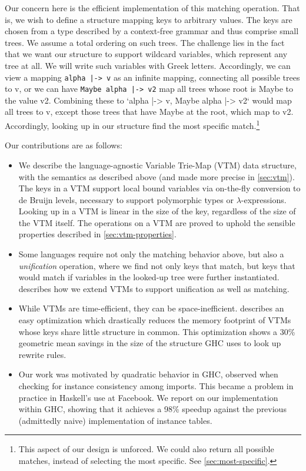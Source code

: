 \documentclass[acmsmall]{acmart}
\theoremstyle{theorem}
\theoremstyle{definition}
\theoremstyle{remark}
\begin{document}
Our concern here is the efficient implementation of this matching
operation. That is, we wish to define a structure mapping keys to
arbitrary values. The keys are chosen from a type described by a
context-free grammar and thus comprise small trees. We assume a total
ordering on such trees. The challenge lies in the fact that we want
our structure to support wildcard variables, which represent any tree
at all. We will write such variables with Greek letters. Accordingly,
we can view a mapping \lstinline{alpha |-> v} as an infinite mapping, connecting
all possible trees to v, or we can have \lstinline{Maybe alpha |-> v2} map all
trees whose root is Maybe to the value v2. Combining these to `alpha
|-> v, Maybe alpha |-> v2` would map all trees to v, except those
trees that have Maybe at the root, which map to v2. Accordingly,
looking up in our structure find the most specific
match.\footnote{This aspect of our design is unforced. We could also
return all possible matches, instead of selecting the most
specific. See \cref{sec:most-specific}.}

Our contributions are as follows:

\begin{itemize}
\item We describe the language-agnostic Variable Trie-Map (VTM) data structure, with the semantics as described above (and made more precise in \cref{sec:vtm}). The keys in a VTM support local bound variables via on-the-fly conversion to de Bruijn levels, necessary to support polymorphic types or $\lambda$-expressions. Looking up in a VTM is linear in the size of the key, regardless of the size of the VTM itself. The operations on a VTM are proved to uphold the sensible properties described in \cref{sec:vtm-properties}.
\item Some languages require not only the matching behavior above, but also a \emph{unification} operation, where we find not only keys that match, but keys that would match if variables in the looked-up tree were further instantiated.  describes how we extend VTMs to support unification as well as matching.
\item While VTMs are time-efficient, they can be space-inefficient.  describes an easy optimization which drastically reduces the memory footprint of VTMs whose keys share little structure in common. This optimization shows a 30\% geometric mean savings in the size of the structure GHC uses to look up rewrite rules.
\item Our work was motivated by quadratic behavior in GHC, observed when checking for instance consistency among imports. This became a problem in practice in Haskell's use at Facebook. We report on our implementation within GHC, showing that it achieves a 98\% speedup against the previous (admittedly naive) implementation of instance tables.
\end{itemize}
\end{document}
